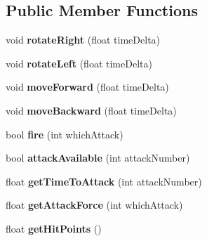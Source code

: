 \subsection*{Public Member Functions}
\begin{DoxyCompactItemize}
\item 
\hypertarget{class_mothership_controller_a306e34f3ed989af36bd06c850ee77106}{}void {\bfseries rotate\+Right} (float time\+Delta)\label{class_mothership_controller_a306e34f3ed989af36bd06c850ee77106}

\item 
\hypertarget{class_mothership_controller_afcb3e363ba64e73de1b3022608c90fe0}{}void {\bfseries rotate\+Left} (float time\+Delta)\label{class_mothership_controller_afcb3e363ba64e73de1b3022608c90fe0}

\item 
\hypertarget{class_mothership_controller_ae78e2b644c490d2b48de365790eaa978}{}void {\bfseries move\+Forward} (float time\+Delta)\label{class_mothership_controller_ae78e2b644c490d2b48de365790eaa978}

\item 
\hypertarget{class_mothership_controller_abfec28f3a1809ed285ee9040401e2dc9}{}void {\bfseries move\+Backward} (float time\+Delta)\label{class_mothership_controller_abfec28f3a1809ed285ee9040401e2dc9}

\item 
\hypertarget{class_mothership_controller_ad88b23d0c93fdc1f8f1d412c831754b1}{}bool {\bfseries fire} (int which\+Attack)\label{class_mothership_controller_ad88b23d0c93fdc1f8f1d412c831754b1}

\item 
\hypertarget{class_mothership_controller_a5a4795ea30f19b4965061920635434f2}{}bool {\bfseries attack\+Available} (int attack\+Number)\label{class_mothership_controller_a5a4795ea30f19b4965061920635434f2}

\item 
\hypertarget{class_mothership_controller_aa31b1f7f1501e60cdec39f7fb65e90b2}{}float {\bfseries get\+Time\+To\+Attack} (int attack\+Number)\label{class_mothership_controller_aa31b1f7f1501e60cdec39f7fb65e90b2}

\item 
\hypertarget{class_mothership_controller_a52ddeaba3194b1e5b89c9bde762e1ced}{}float {\bfseries get\+Attack\+Force} (int which\+Attack)\label{class_mothership_controller_a52ddeaba3194b1e5b89c9bde762e1ced}

\item 
\hypertarget{class_mothership_controller_a3f376b3a96381e7303af54a495ecc6e4}{}float {\bfseries get\+Hit\+Points} ()\label{class_mothership_controller_a3f376b3a96381e7303af54a495ecc6e4}


\end{DoxyCompactItemize}
